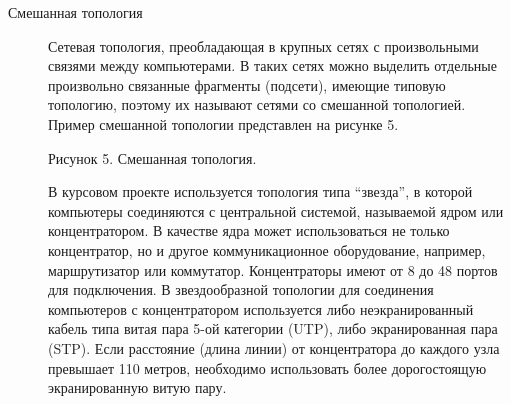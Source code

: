 \begin{description}
\item[Смешанная топология]
  Сетевая топология, преобладающая в крупных сетях с произвольными связями между компьютерами. В таких сетях можно выделить отдельные произвольно связанные фрагменты (подсети), имеющие типовую топологию, поэтому их называют сетями со смешанной топологией. Пример смешанной топологии представлен на рисунке 5.

Рисунок 5. Смешанная топология.

В курсовом проекте используется топология типа “звезда”, в которой компьютеры соединяются с центральной системой, называемой ядром или концентратором. В качестве ядра может использоваться не только концентратор, но и другое коммуникационное оборудование, например, маршрутизатор или коммутатор. Концентраторы имеют от 8 до 48 портов для подключения. В звездообразной топологии для соединения компьютеров с концентратором используется либо неэкранированный кабель типа витая пара 5-ой категории (UTP), либо экранированная пара (STP). Если расстояние (длина линии) от концентратора до каждого узла превышает 110 метров, необходимо использовать более дорогостоящую экранированную витую пару.
\end{description}